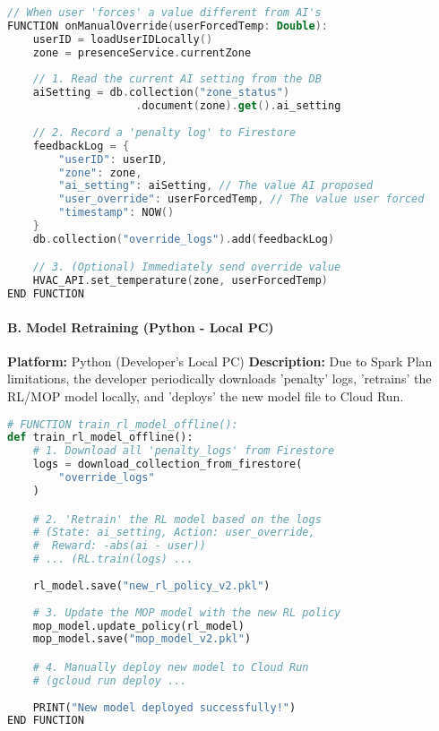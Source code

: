 \documentclass[conference]{IEEEtran}
\begin{document}
\begin{lstlisting}[language=Kotlin]
// When user 'forces' a value different from AI's
FUNCTION onManualOverride(userForcedTemp: Double):
    userID = loadUserIDLocally()
    zone = presenceService.currentZone
    
    // 1. Read the current AI setting from the DB
    aiSetting = db.collection("zone_status")
                    .document(zone).get().ai_setting
    
    // 2. Record a 'penalty log' to Firestore
    feedbackLog = {
        "userID": userID,
        "zone": zone,
        "ai_setting": aiSetting, // The value AI proposed
        "user_override": userForcedTemp, // The value user forced
        "timestamp": NOW()
    }
    db.collection("override_logs").add(feedbackLog)

    // 3. (Optional) Immediately send override value
    HVAC_API.set_temperature(zone, userForcedTemp)
END FUNCTION
\end{lstlisting}


\paragraph{B. Model Retraining (Python - Local PC)}
\textbf{Platform:} Python (Developer's Local PC) \newline 
\textbf{Description:} Due to Spark Plan limitations, the developer periodically downloads 'penalty' logs, 'retrains' the RL/MOP model locally, and 'deploys' the new model file to Cloud Run. 

\begin{lstlisting}[language=Python]
# FUNCTION train_rl_model_offline():
def train_rl_model_offline():
    # 1. Download all 'penalty_logs' from Firestore
    logs = download_collection_from_firestore(
        "override_logs"
    )

    # 2. 'Retrain' the RL model based on the logs
    # (State: ai_setting, Action: user_override, 
    #  Reward: -abs(ai - user))
    # ... (RL.train(logs) ...
    
    rl_model.save("new_rl_policy_v2.pkl")
    
    # 3. Update the MOP model with the new RL policy
    mop_model.update_policy(rl_model)
    mop_model.save("mop_model_v2.pkl")

    # 4. Manually deploy new model to Cloud Run
    # (gcloud run deploy ...
    
    PRINT("New model deployed successfully!")
END FUNCTION
\end{lstlisting}
\end{document}
